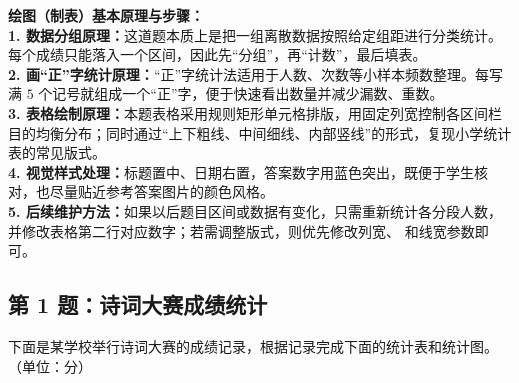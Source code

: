 \vspace{0.7cm}

{\small\color{blue!70!black}
\textbf{绘图（制表）基本原理与步骤：}\\
\textbf{1. 数据分组原理：}这道题本质上是把一组离散数据按照给定组距进行分类统计。每个成绩只能落入一个区间，因此先“分组”，再“计数”，最后填表。\\
\textbf{2. 画“正”字统计原理：}“正”字统计法适用于人数、次数等小样本频数整理。每写满 $5$ 个记号就组成一个“正”字，便于快速看出数量并减少漏数、重数。\\
\textbf{3. 表格绘制原理：}本题表格采用规则矩形单元格排版，用固定列宽控制各区间栏目的均衡分布；同时通过“上下粗线、中间细线、内部竖线”的形式，复现小学统计表的常见版式。\\
\textbf{4. 视觉样式处理：}标题置中、日期右置，答案数字用蓝色突出，既便于学生核对，也尽量贴近参考答案图片的颜色风格。\\
\textbf{5. 后续维护方法：}如果以后题目区间或数据有变化，只需重新统计各分段人数，并修改表格第二行对应数字；若需调整版式，则优先修改列宽、\texttt{\arraystretch} 和线宽参数即可。
}


\newpage

\newpage

\subsection{第 1 题：诗词大赛成绩统计}

下面是某学校举行诗词大赛的成绩记录，根据记录完成下面的统计表和统计图。（单位：分）

